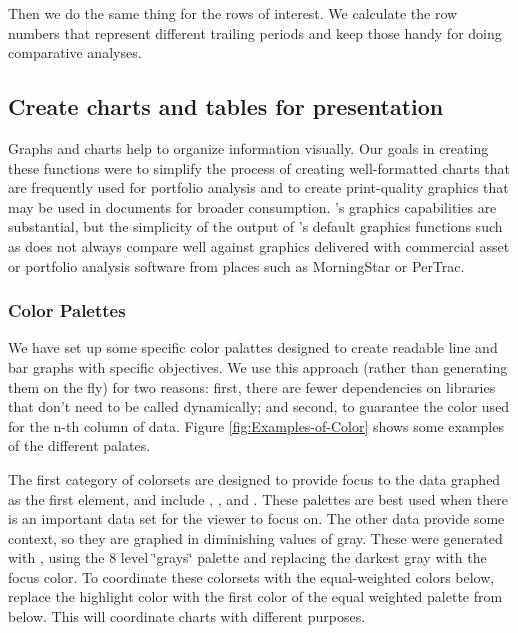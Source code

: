 \documentclass[12pt,letterpaper,english]{article}
\begin{document}
Then we do the same thing for the rows of interest. We calculate the
row numbers that represent different trailing periods and keep those
handy for doing comparative analyses.


\subsection{Create charts and tables for presentation}

Graphs and charts help to organize information visually. Our goals
in creating these functions were to simplify the process of creating
well-formatted charts that are frequently used for portfolio analysis
and to create print-quality graphics that may be used in documents
for broader consumption. \R's graphics capabilities are substantial,
but the simplicity of the output of \R's default graphics functions
such as  does not always compare well against
graphics delivered with commercial asset or portfolio analysis software
from places such as MorningStar or PerTrac.


\subsubsection*{Color Palettes}

We have set up some specific color palattes designed to create readable
line and bar graphs with specific objectives. We use this approach
(rather than generating them on the fly) for two reasons: first, there
are fewer dependencies on libraries that don't need to be called dynamically;
and second, to guarantee the color used for the n-th column of data.
Figure \ref{fig:Examples-of-Color} shows some examples of the different
palates.

The first category of colorsets are designed to provide focus to the
data graphed as the first element, and include ,
, and . These palettes are
best used when there is an important data set for the viewer to focus
on. The other data provide some context, so they are graphed in diminishing
values of gray. These were generated with ,
using the 8 level \char`\"{}grays\char`\"{} palette and replacing
the darkest gray with the focus color. To coordinate these colorsets
with the equal-weighted colors below, replace the highlight color
with the first color of the equal weighted palette from below. This
will coordinate charts with different purposes.
\end{document}
